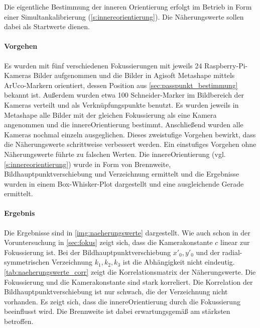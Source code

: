 \documentclass[./00PhotoBox.tex]{subfiles}
\begin{document}
Die eigentliche Bestimmung der inneren Orientierung erfolgt im Betrieb in Form einer Simultankalibrierung (\autoref{s:innereorientierung}). Die Näherungswerte sollen dabei als Startwerte dienen.

\paragraph{Vorgehen}

Es wurden mit fünf verschiedenen Fokussierungen mit jeweils 24 Rasp\-berry-Pi-Kameras Bilder aufgenommen und die Bilder in Agisoft Metashape mittels ArUco-Markern orientiert, dessen Position aus \autoref{sec:passpunkt_bestimmung} bekannt ist. Außerdem wurden etwa 100 Schneider-Marker im Bildbereich der Kameras verteilt und als Verknüpfungspunkte benutzt. Es wurden jeweils in Metashape alle Bilder mit der gleichen Fokussierung als eine Kamera angenommen und die \gls{innereOrientierung} bestimmt. Anschließend wurden alle Kameras nochmal einzeln ausgeglichen. Dieses zweistufige Vorgehen bewirkt, dass die Näherungswerte schrittweise verbessert werden. Ein einstufiges Vorgehen ohne Näherungswerte führte zu falschen Werten. Die \gls{innereOrientierung} (vgl. \autoref{s:innereorientierung}) wurde in Form von Brennweite, \Gls{Bildhauptpunkt}verschiebung und \Gls{Verzeichnung} ermittelt und die Ergebnisse wurden in einem Box-Whisker-Plot dargestellt und eine ausgleichende Gerade ermittelt.

\paragraph{Ergebnis}

Die Ergebnisse sind in \autoref{img:naeherungswerte} dargestellt. Wie auch schon in der Voruntersuchung in \autoref{sec:fokus} zeigt sich, dass die \Gls{Kamerakonstante} $c$ linear zur Fokussierung ist. Bei der \Gls{Bildhauptpunkt}verschiebung $x'_0, y'_0$ und der radial-symmetrischen \Gls{Verzeichnung} $k_1,k_2,k_3$ ist die Abhängigkeit nicht eindeutig. \autoref{tab:naeherungswerte_corr} zeigt die Korrelationsmatrix der Näherungswerte. Die Fokussierung und die \Gls{Kamerakonstante} sind stark korreliert. Die Korrelation der \Gls{Bildhauptpunkt}verschiebung ist nur schwach, die der \Gls{Verzeichnung} nicht vorhanden. Es zeigt sich, dass die \gls{innereOrientierung} durch die Fokussierung beeinflusst wird. Die \Gls{Brennweite} ist dabei erwartungsgemäß am stärksten betroffen.
\end{document}
